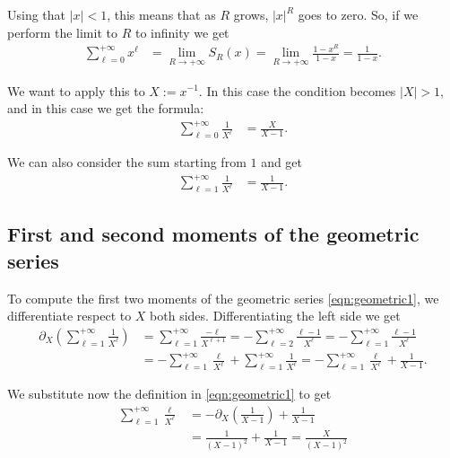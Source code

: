 \documentclass[a4paper,oneside,11pt]{book}
\begin{document}
Using that $\left|x\right|<1$, this means that as $R$ grows, $\left|x\right|^R$ goes to zero. So, if we perform the limit to $R$ to infinity we get
\begin{align}
	\sum_{\ell=0}^{+\infty}x^\ell
	&=\lim_{R\to+\infty}S_R\left(x\right)
	=\lim_{R\to+\infty}\frac{1-x^R}{1-x}
	=\frac1{1-x}.
\end{align}

We want to apply this to $X:=x^{-1}$. In this case the condition becomes $\left|X\right|>1$, and in this case we get the formula:
\begin{align}
\label{eqn:geometric0}
	\sum_{\ell=0}^{+\infty}\frac1{X^\ell}
	&=\frac X{X-1}.
\end{align}

We can also consider the sum starting from $1$ and get
\begin{align}
\label{eqn:geometric1}
	\sum_{\ell=1}^{+\infty}\frac1{X^\ell}
	&=\frac1{X-1}.
\end{align}

\subsection{First and second moments of the geometric series}
To compute the first two moments of the geometric series \eqref{eqn:geometric1}, we differentiate respect to $X$ both sides. Differentiating the left side we get
\begin{align}
	\partial_X\left(\sum_{\ell=1}^{+\infty}\frac1{X^\ell}\right)
	&=\sum_{\ell=1}^{+\infty}\frac{-\ell}{X^{\ell+1}}
	=-\sum_{\ell=2}^{+\infty}\frac{\ell-1}{X^\ell}
	=-\sum_{\ell=1}^{+\infty}\frac{\ell-1}{X^\ell}
\\
	&=-\sum_{\ell=1}^{+\infty}\frac{\ell}{X^\ell}
	+\sum_{\ell=1}^{+\infty}\frac1{X^\ell}
	=-\sum_{\ell=1}^{+\infty}\frac{\ell}{X^\ell}
	+\frac1{X-1}.
\end{align}

We substitute now the definition in \eqref{eqn:geometric1} to get
\begin{align}
	\sum_{\ell=1}^{+\infty}\frac{\ell}{X^\ell}
	&=-\partial_X\left(\frac1{X-1}\right)
	+\frac1{X-1}
\\
\label{eqn:geometric:firstmoment}
	&=\frac1{\left(X-1\right)^2}
	+\frac1{X-1}
	=\frac X{\left(X-1\right)^2}
\end{align}
\end{document}
